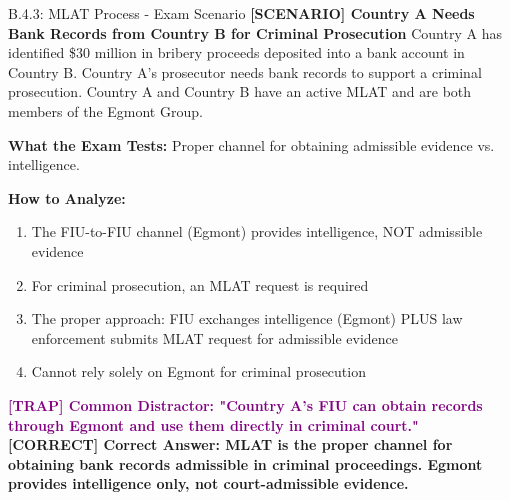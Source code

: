 \documentclass[11pt,a4paper]{beamer}
\newcommand{\trap}[1]{\textcolor{purple}{\textbf{[TRAP] #1}}}
\newcommand{\correct}[1]{\textcolor{green!50!black}{\textbf{[CORRECT] #1}}}
\newcommand{\scenario}[1]{\textcolor{blue!70!black}{\textbf{[SCENARIO] #1}}}
\begin{document}
	\begin{frame}{B.4.3: MLAT Process - Exam Scenario}
		\scenario{Country A Needs Bank Records from Country B for Criminal Prosecution}
		Country A has identified \$30 million in bribery proceeds deposited into a bank account in Country B. Country A's prosecutor needs bank records to support a criminal prosecution. Country A and Country B have an active MLAT and are both members of the Egmont Group.
		
		\vspace{0.1cm}
		\textbf{What the Exam Tests:} Proper channel for obtaining admissible evidence vs. intelligence.
		
		\vspace{0.1cm}
		\textbf{How to Analyze:}
		\begin{enumerate}
			\item The FIU-to-FIU channel (Egmont) provides intelligence, NOT admissible evidence
			\item For criminal prosecution, an MLAT request is required
			\item The proper approach: FIU exchanges intelligence (Egmont) PLUS law enforcement submits MLAT request for admissible evidence
			\item Cannot rely solely on Egmont for criminal prosecution
		\end{enumerate}
		
		\trap{Common Distractor: "Country A's FIU can obtain records through Egmont and use them directly in criminal court."}
		\correct{Correct Answer: MLAT is the proper channel for obtaining bank records admissible in criminal proceedings. Egmont provides intelligence only, not court-admissible evidence.}
	\end{frame}
	
	
\end{document}
